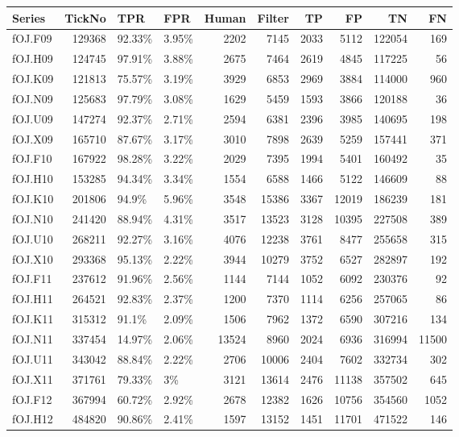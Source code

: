 \documentclass[a4paper,12pt,openany, DIV=calc, headsepline]{scrbook}
\begin{document}
{\scriptsize
\begin{longtable}{lrllrrrrrr}
  \hline
Series & TickNo & TPR & FPR & Human & Filter & TP & FP & TN & FN \\ 
  \hline
  fOJ.F09 & 129368 & 92.33\% & 3.95\% & 2202 & 7145 & 2033 & 5112 & 122054 & 169 \\ 
  fOJ.H09 & 124745 & 97.91\% & 3.88\% & 2675 & 7464 & 2619 & 4845 & 117225 &  56 \\ 
  fOJ.K09 & 121813 & 75.57\% & 3.19\% & 3929 & 6853 & 2969 & 3884 & 114000 & 960 \\ 
  fOJ.N09 & 125683 & 97.79\% & 3.08\% & 1629 & 5459 & 1593 & 3866 & 120188 &  36 \\ 
  fOJ.U09 & 147274 & 92.37\% & 2.71\% & 2594 & 6381 & 2396 & 3985 & 140695 & 198 \\ 
  fOJ.X09 & 165710 & 87.67\% & 3.17\% & 3010 & 7898 & 2639 & 5259 & 157441 & 371 \\ 
  fOJ.F10 & 167922 & 98.28\% & 3.22\% & 2029 & 7395 & 1994 & 5401 & 160492 &  35 \\ 
  fOJ.H10 & 153285 & 94.34\% & 3.34\% & 1554 & 6588 & 1466 & 5122 & 146609 &  88 \\ 
  fOJ.K10 & 201806 & 94.9\% & 5.96\% & 3548 & 15386 & 3367 & 12019 & 186239 & 181 \\ 
  fOJ.N10 & 241420 & 88.94\% & 4.31\% & 3517 & 13523 & 3128 & 10395 & 227508 & 389 \\ 
  fOJ.U10 & 268211 & 92.27\% & 3.16\% & 4076 & 12238 & 3761 & 8477 & 255658 & 315 \\ 
  fOJ.X10 & 293368 & 95.13\% & 2.22\% & 3944 & 10279 & 3752 & 6527 & 282897 & 192 \\ 
  fOJ.F11 & 237612 & 91.96\% & 2.56\% & 1144 & 7144 & 1052 & 6092 & 230376 &  92 \\ 
  fOJ.H11 & 264521 & 92.83\% & 2.37\% & 1200 & 7370 & 1114 & 6256 & 257065 &  86 \\ 
  fOJ.K11 & 315312 & 91.1\% & 2.09\% & 1506 & 7962 & 1372 & 6590 & 307216 & 134 \\ 
  fOJ.N11 & 337454 & 14.97\% & 2.06\% & 13524 & 8960 & 2024 & 6936 & 316994 & 11500 \\ 
  fOJ.U11 & 343042 & 88.84\% & 2.22\% & 2706 & 10006 & 2404 & 7602 & 332734 & 302 \\ 
  fOJ.X11 & 371761 & 79.33\% & 3\% & 3121 & 13614 & 2476 & 11138 & 357502 & 645 \\ 
  fOJ.F12 & 367994 & 60.72\% & 2.92\% & 2678 & 12382 & 1626 & 10756 & 354560 & 1052 \\ 
  fOJ.H12 & 484820 & 90.86\% & 2.41\% & 1597 & 13152 & 1451 & 11701 & 471522 & 146 \\ 

\end{longtable}}
\end{document}
